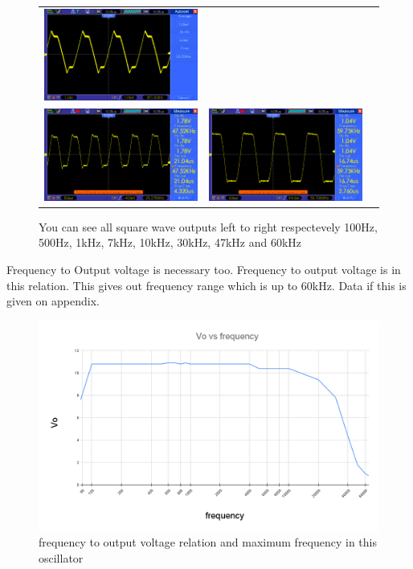 \documentclass[14pt,a4paper]{extarticle}
\begin{document}
\begin{figure}[H]
\begin{tabular}{ccc}
    \includegraphics[width=.49\linewidth]{imgs/square30k.png}\\
    \includegraphics[width=.49\linewidth]{imgs/square47k.png}&
    \includegraphics[width=.49\linewidth]{imgs/square60k.png}
\end{tabular}
\vspace{0.2cm}
\caption{You can see all square wave outputs left to right respectevely 100Hz, 500Hz, 1kHz, 7kHz, 10kHz, 30kHz, 47kHz and 60kHz}
\label{fig:filters}
\end{figure}



Frequency to Output voltage is necessary too. Frequency to output voltage is in this relation. This gives out frequency range which is up to 60kHz. Data if this is given on appendix.


\begin{figure}[H]
\centering
\includegraphics[width=1\linewidth]{imgs/squaregraph.png}
\caption{frequency to output voltage relation and maximum frequency in this oscillator}
\end{figure}
\end{document}
